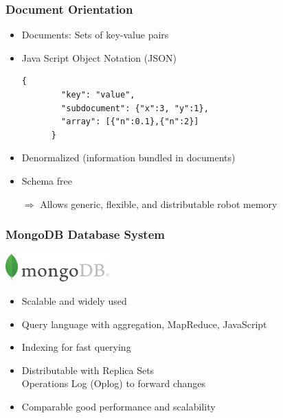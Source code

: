 \begin{frame}[fragile]
  \frametitle{Document Orientation}
  \begin{itemize}
  \item Documents: Sets of key-value pairs
  \item Java Script Object Notation (JSON)
    \begin{lstlisting}[style=SmallJSON,linewidth=8.5cm,
      label=lst:json,
      framexleftmargin=1pt, xleftmargin=0pt,
      morekeywords={}, numbers=none]
      {
        "key": "value",
        "subdocument": {"x":3, "y":1},
        "array": [{"n":0.1},{"n":2}]
      }
    \end{lstlisting}
  \item Denormalized (information bundled in documents)
  \item Schema free
  \end{itemize}
  \begin{itemize}
  \item[$\Rightarrow$] Allows generic, flexible, and distributable robot memory
  \end{itemize}
\end{frame}

\begin{frame}[fragile]
  \frametitle{MongoDB Database System}
  \hfill\includegraphics[width=0.3\textwidth]{../thesis/img/mongodb}
  \begin{itemize}
    \item Scalable and widely used
    \item Query language with aggregation, MapReduce, JavaScript %
    \item Indexing for fast querying
    \item Distributable with Replica Sets\\ %
      Operations Log (Oplog) to forward changes
    \item Comparable good performance and scalability\\\cite{arango-vs-mongo,db-comparison}
  \end{itemize}
\end{frame}

